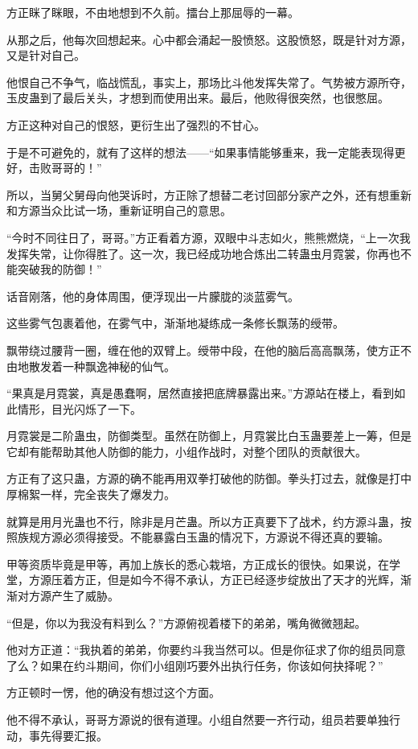 \begin{this_body}
方正眯了眯眼，不由地想到不久前。擂台上那屈辱的一幕。

从那之后，他每次回想起来。心中都会涌起一股愤怒。这股愤怒，既是针对方源，又是针对自己。

他恨自己不争气，临战慌乱，事实上，那场比斗他发挥失常了。气势被方源所夺，玉皮蛊到了最后关头，才想到而使用出来。最后，他败得很突然，也很憋屈。

方正这种对自己的恨怒，更衍生出了强烈的不甘心。

于是不可避免的，就有了这样的想法——“如果事情能够重来，我一定能表现得更好，击败哥哥的！”

所以，当舅父舅母向他哭诉时，方正除了想替二老讨回部分家产之外，还有想重新和方源当众比试一场，重新证明自己的意思。

“今时不同往日了，哥哥。”方正看着方源，双眼中斗志如火，熊熊燃烧，“上一次我发挥失常，让你得胜了。这一次，我已经成功地合炼出二转蛊虫月霓裳，你再也不能突破我的防御！”

话音刚落，他的身体周围，便浮现出一片朦胧的淡蓝雾气。

这些雾气包裹着他，在雾气中，渐渐地凝练成一条修长飘荡的绶带。

飘带绕过腰背一圈，缠在他的双臂上。绶带中段，在他的脑后高高飘荡，使方正不由地散发着一种飘逸神秘的仙气。

“果真是月霓裳，真是愚蠢啊，居然直接把底牌暴露出来。”方源站在楼上，看到如此情形，目光闪烁了一下。

月霓裳是二阶蛊虫，防御类型。虽然在防御上，月霓裳比白玉蛊要差上一筹，但是它却有能帮助其他人防御的能力，小组作战时，对整个团队的贡献很大。

方正有了这只蛊，方源的确不能再用双拳打破他的防御。拳头打过去，就像是打中厚棉絮一样，完全丧失了爆发力。

就算是用月光蛊也不行，除非是月芒蛊。所以方正真要下了战术，约方源斗蛊，按照族规方源必须得接受。不能暴露白玉蛊的情况下，方源说不得还真的要输。

甲等资质毕竟是甲等，再加上族长的悉心栽培，方正成长的很快。如果说，在学堂，方源压着方正，但是如今不得不承认，方正已经逐步绽放出了天才的光辉，渐渐对方源产生了威胁。

“但是，你以为我没有料到么？”方源俯视着楼下的弟弟，嘴角微微翘起。

他对方正道：“我执着的弟弟，你要约斗我当然可以。但是你征求了你的组员同意了么？如果在约斗期间，你们小组刚巧要外出执行任务，你该如何抉择呢？”

方正顿时一愣，他的确没有想过这个方面。

他不得不承认，哥哥方源说的很有道理。小组自然要一齐行动，组员若要单独行动，事先得要汇报。


\end{this_body}
